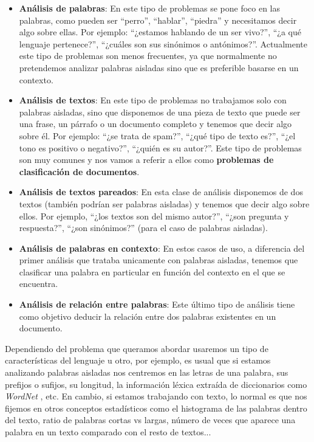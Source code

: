 \begin{itemize}
	\item \textbf{Análisis de palabras}: En este tipo de problemas se pone foco en las palabras, como pueden ser ``perro'', ``hablar'', ``piedra'' y necesitamos decir algo sobre ellas. Por ejemplo: ``¿estamos hablando de un ser vivo?'', ``¿a qué lenguaje pertenece?'', ``¿cuáles son sus sinónimos o antónimos?''. Actualmente este tipo de problemas son menos frecuentes, ya que normalmente no pretendemos analizar palabras aisladas sino que es preferible basarse en un contexto. 
	
	\item \textbf{Análisis de textos}:  En este tipo de problemas no trabajamos solo con palabras aisladas, sino que disponemos de una pieza de texto que puede ser una frase, un párrafo o un documento completo y tenemos que decir algo sobre él. Por ejemplo: ``¿se trata de spam?'', ``¿qué tipo de texto es?'', ``¿el tono es positivo o negativo?'', ``¿quién es su autor?''. Este tipo de problemas son muy comunes y nos vamos a referir a ellos como \textbf{problemas de clasificación de documentos}.   
	
	\item \textbf{Análisis de textos pareados}: En esta clase de análisis disponemos de  dos textos (también podrían ser palabras aisladas) y tenemos que decir algo sobre ellos. Por ejemplo, ``¿los textos son del mismo autor?'', ``¿son pregunta y respuesta?'', ``¿son sinónimos?'' (para el caso de palabras aisladas).
	
	\item \textbf{Análisis de palabras en contexto}: En estos casos de uso, a diferencia del primer análisis que trataba unicamente con  palabras aisladas, tenemos que clasificar una palabra en particular en función del contexto en el que se encuentra. 
	
	\item \textbf{Análisis de relación entre palabras}: Este último tipo de análisis tiene como objetivo deducir la relación entre dos palabras existentes en un documento. 
	
\end{itemize}

Dependiendo del problema que queramos abordar usaremos un tipo de características del lenguaje u otro, por ejemplo, es usual que si estamos analizando palabras aisladas nos centremos en las letras de una palabra, sus prefijos o sufijos, su longitud, la información léxica extraída de diccionarios como \textit{WordNet} \cite{wordnet}, etc. En cambio, si estamos trabajando con texto, lo normal es que nos fijemos en otros conceptos estadísticos como el histograma de las palabras dentro del texto, ratio de palabras cortas vs largas, número de veces que aparece una palabra en un texto comparado con el resto de textos...  

